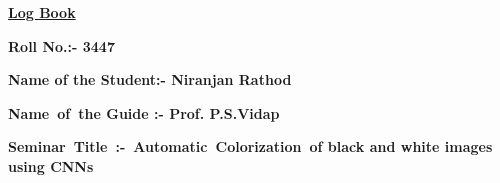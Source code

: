 \documentclass[12pt]{article}
\begin{document}
\begin{Center}
{\fontsize{14pt}{16.8pt}\selectfont \textbf{\uline{Log Book }}\par}
\end{Center}\par

{\fontsize{14pt}{16.8pt}\selectfont \textbf{Roll No.\tab \tab \tab :- 3447}\par}\par

{\fontsize{14pt}{16.8pt}\selectfont \textbf{Name of the Student\tab :- Niranjan Rathod}\par}\par

{\fontsize{14pt}{16.8pt}\selectfont \textbf{Name\ of\ the Guide   \tab :- Prof. P.S.Vidap}\par}\par

{\fontsize{14pt}{16.8pt}\selectfont \textbf{Seminar\ Title\   \tab \tab :-\ Automatic\ Colorization\ of black and  white  images  using CNNs}\par}\par


\vspace{\baselineskip}


\end{document}
